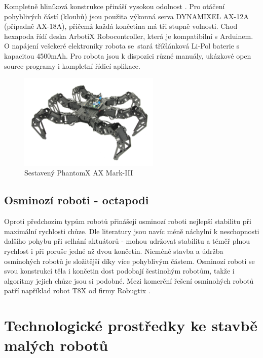 Kompletně hliníková konstrukce přináší vysokou odolnost \cite{PhantomX}. Pro otáčení pohyblivých částí (kloubů) jsou použita výkonná serva DYNAMIXEL AX-12A (případně AX-18A), přičemž každá končetina má tři stupně volnosti. Chod hexapoda řídí deska ArbotiX Robocontroller, která je kompatibilní s Arduinem. O napájení vešekeré elektroniky robota se~stará tříčlánková Li-Pol baterie s kapacitou 4500mAh. Pro robota jsou k dispozici různé manuály, ukázkové open source programy i kompletní řídicí aplikace.

\begin{figure}[hbt]
	\centering
	\includegraphics[width=0.6\textwidth]{obrazky-figures/hex-a.jpg}
	\caption[phantom]{Sestavený PhantomX AX Mark-III \cite{PhantomX}}
	\label{hexphantom}
\end{figure}


\section{Osminozí roboti - octapodi}
Oproti předchozím typům robotů přinášejí osminozí roboti nejlepší stabilitu při maximální rychlosti chůze. Dle literatury \cite{ArachnidRobot} jsou navíc méně náchylní k neschopnosti dalšího pohybu při selhání aktuátorů - mohou udržovat stabilitu a téměř plnou rychlost i při poruše jedné až dvou končetin. Nicméně stavba a údržba osminohých robotů je složitější díky více pohyblivým částem. Osminozí roboti se svou konstrukcí těla i končetin dost podobají šestinohým robotům, takže i algoritmy jejich chůze jsou si podobné. Mezi komerční řešení osminohých robotů patří například robot T8X od firmy Robugtix \cite{t8x}.



\chapter{Technologické prostředky ke stavbě malých robotů}
\label{chaptertechnologies}

